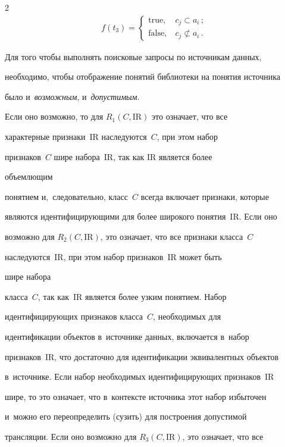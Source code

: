 \begin{multicols}{2}
\begin{gather*}
f(t_3) = \begin{cases}

\mbox{true}, &\ c_j\subset a_i\,;\\

\mbox{false}, &\ c_j \not\subset a_i\,.

\end{cases}

\end{gather*}

    

    Для того чтобы выполнять поисковые запросы по источникам данных, 

необходимо, чтобы отображение понятий библиотеки на понятия источника 

было и~\textit{возможным}, и~\textit{допустимым}.

    

    Если оно возможно, то для $R_1(C, \mathrm{IR})$ это означает, что все 

характерные признаки~$\mathrm{IR}$ наследуются~$C$, при этом набор 

признаков~$C$ шире набора~$\mathrm{IR}$, так как $\mathrm{IR}$ является более

 объемлющим 

понятием и,~следовательно, класс~$C$ всегда включает признаки, которые 

являются идентифицирующими для более широкого понятия~$\mathrm{IR}$. Если оно 

возможно для $R_2(C, \mathrm{IR})$, это означает, что все признаки класса~$C$ 

наследуются~$\mathrm{IR}$, при этом набор признаков~$\mathrm{IR}$ может быть 

шире набора 

класса~$C$, так как~$\mathrm{IR}$ является более узким понятием. Набор 

идентифицирующих признаков класса~$C$, необходимых для 

идентификации объектов в~источнике данных, включается в~набор 

признаков~$\mathrm{IR}$, что достаточно для идентификации эквивалентных объектов 

в~источнике. Если набор необходимых идентифицирующих признаков~$\mathrm{IR}$ 

шире, то это означает, что в~контексте источника этот набор избыточен 

и~можно его переопределить (сузить) для по\-стро\-ения допустимой 

трансляции. Если оно возможно для $R_3(C, \mathrm{IR})$, это означает, что все 


\end{multicols}
